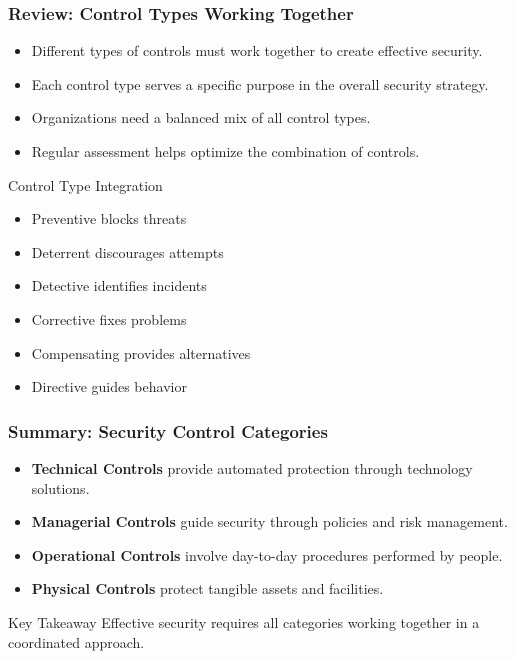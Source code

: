 \documentclass{beamer}
\begin{document}
\begin{frame}
    \frametitle{Review: Control Types Working Together}
    
    \begin{itemize}
        \item Different types of controls must work together to create effective security.
        
        \item Each control type serves a specific purpose in the overall security strategy.
        
        \item Organizations need a balanced mix of all control types.
        
        \item Regular assessment helps optimize the combination of controls.
    \end{itemize}
    
    \begin{exampleblock}{Control Type Integration}
        \begin{itemize}
            \item Preventive blocks threats
            \item Deterrent discourages attempts
            \item Detective identifies incidents
            \item Corrective fixes problems
            \item Compensating provides alternatives
            \item Directive guides behavior
        \end{itemize}
    \end{exampleblock}
\end{frame}

\begin{frame}
    \frametitle{Summary: Security Control Categories}
    
    \begin{itemize}
        \item \textbf{Technical Controls} provide automated protection through technology solutions.
        
        \item \textbf{Managerial Controls} guide security through policies and risk management.
        
        \item \textbf{Operational Controls} involve day-to-day procedures performed by people.
        
        \item \textbf{Physical Controls} protect tangible assets and facilities.
    \end{itemize}
    
    \begin{alertblock}{Key Takeaway}
        Effective security requires all categories working together in a coordinated approach.
    \end{alertblock}
\end{frame}
\end{document}
